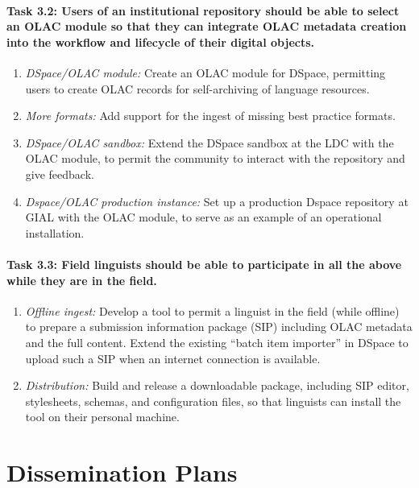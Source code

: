 \def\task{3.2}
\paragraph{Task {\task}: Users of an institutional repository should be
    able to select an OLAC module so that they can integrate OLAC
    metadata creation into the workflow and lifecycle of their
    digital objects.}

\begin{enumerate}[label=\emph{\task\alph*}]
\item \emph{DSpace/OLAC module:}
  Create an OLAC module for DSpace, permitting users to create OLAC
  records for self-archiving of language resources.
\item \emph{More formats:}
  Add support for the ingest of missing best practice formats.
\item \emph{DSpace/OLAC sandbox:}
  Extend the DSpace sandbox at the LDC with the OLAC module,
  to permit the community to interact with the repository and give feedback.
\item \emph{Dspace/OLAC production instance:}
  Set up a production Dspace repository at GIAL with the OLAC module, to serve
  as an example of an operational installation. 
\end{enumerate}

\def\task{3.3}
\paragraph{Task {\task}: Field linguists should be able to participate in all the
    above while they are in the field.}

\begin{enumerate}[label=\emph{\task\alph*}]
\item \emph{Offline ingest:}
  Develop a tool to permit a linguist in the field (while offline) to
  prepare a submission information package (SIP) including OLAC
  metadata and the full content. 
  Extend the existing ``batch item importer'' in DSpace to 
  upload such a SIP when an internet connection is available.
\item \emph{Distribution:}
  Build and release a downloadable package, including SIP editor,
  stylesheets, schemas, and configuration files, so that linguists
  can install the tool on their personal machine.
\end{enumerate}

\section{Dissemination Plans}
\label{sec:dissemination}

